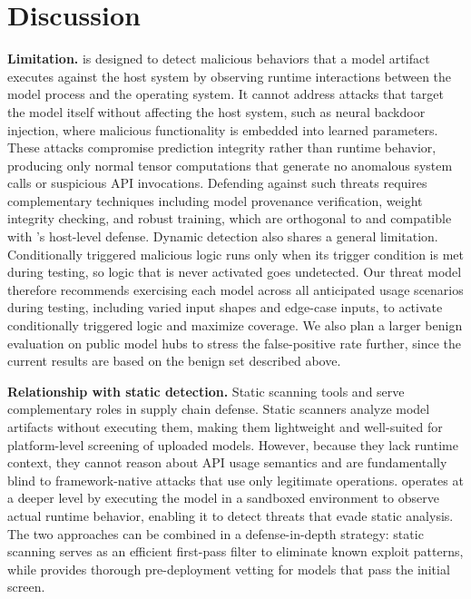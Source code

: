 \section{Discussion}\label{sec:discussion}


\noindent \textbf{Limitation.} 
\toolname{} is designed to detect malicious behaviors that a model artifact executes against the host system by observing runtime interactions between the model process and the operating system. It cannot address attacks that target the model itself without affecting the host system, such as neural backdoor injection, where malicious functionality is embedded into learned parameters. These attacks compromise prediction integrity rather than runtime behavior, producing only normal tensor computations that generate no anomalous system calls or suspicious API invocations. Defending against such threats requires complementary techniques including model provenance verification, weight integrity checking, and robust training, which are orthogonal to and compatible with \toolname{}'s host-level defense. Dynamic detection also shares a general limitation. Conditionally triggered malicious logic runs only when its trigger condition is met during testing, so logic that is never activated goes undetected. Our threat model therefore recommends exercising each model across all anticipated usage scenarios during testing, including varied input shapes and edge-case inputs, to activate conditionally triggered logic and maximize coverage. We also plan a larger benign evaluation on public model hubs to stress the false-positive rate further, since the current results are based on the benign set described above.

\noindent \textbf{Relationship with static detection.} Static scanning tools and \toolname{} serve complementary roles in supply chain defense. Static scanners analyze model artifacts without executing them, making them lightweight and well-suited for platform-level screening of uploaded models. However, because they lack runtime context, they cannot reason about API usage semantics and are fundamentally blind to framework-native attacks that use only legitimate operations. \toolname{} operates at a deeper level by executing the model in a sandboxed environment to observe actual runtime behavior, enabling it to detect threats that evade static analysis. The two approaches can be combined in a defense-in-depth strategy: static scanning serves as an efficient first-pass filter to eliminate known exploit patterns, while \toolname{} provides thorough pre-deployment vetting for models that pass the initial screen.


